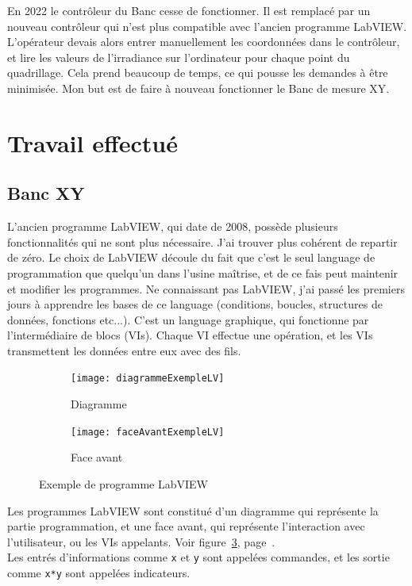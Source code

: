 \documentclass[a4paper, 12pt]{article}
\begin{document}
En 2022 le contrôleur du Banc cesse de fonctionner.  
Il est remplacé par un nouveau contrôleur qui n'est plus compatible avec l'ancien programme LabVIEW.  
L'opérateur devais alors entrer manuellement les coordonnées dans le contrôleur, et lire les valeurs de l'irradiance sur l'ordinateur pour chaque point du quadrillage.  
Cela prend beaucoup de temps, ce qui pousse les demandes à être minimisée.  
Mon but est de faire à nouveau fonctionner le Banc de mesure XY.  
  
  
\section{Travail effectué}
  
\subsection{ Banc XY } 
  
L'ancien programme LabVIEW, qui date de 2008, possède plusieurs fonctionnalités qui ne sont plus nécessaire.  
J'ai trouver plus cohérent de repartir de zéro.  
Le choix de LabVIEW découle du fait que c'est le seul language de programmation que quelqu'un dans l'usine maîtrise, et de ce fais peut maintenir et modifier les programmes.  
Ne connaissant pas LabVIEW, j'ai passé les premiers jours à apprendre les bases de ce language (conditions, boucles, structures de données, fonctions etc...).  
C'est un language graphique, qui fonctionne par l'intermédiaire de blocs (VIs). Chaque VI effectue une opération, et les VIs transmettent les données entre eux avec des fils.  

\begin{figure}[h]
	\begin{subfigure}{0.5\textwidth}
		\centering
		\texttt{[image: diagrammeExempleLV]}
		\caption{Diagramme}
		\label{fig:exempleDiagramme}
	\end{subfigure}
	\begin{subfigure}{0.5\textwidth}
		\centering
		\texttt{[image: faceAvantExempleLV]}
		\caption{Face avant}
		\label{fig:exempleFaceAvant}
	\end{subfigure}

	\caption{Exemple de programme LabVIEW}
	\label{fig:exempleLabVIEW}
\end{figure}



Les programmes LabVIEW sont constitué d'un diagramme qui représente la partie programmation, et une face avant, qui représente l'interaction avec l'utilisateur, ou les VIs appelants.
Voir figure~\ref{fig:exempleLabVIEW}, page~\pageref{fig:exempleLabVIEW}.\\
Les entrés d'informations comme \verb|x| et \verb|y| sont appelées commandes, et les sortie comme \verb|x*y| sont appelées indicateurs.
\end{document}
